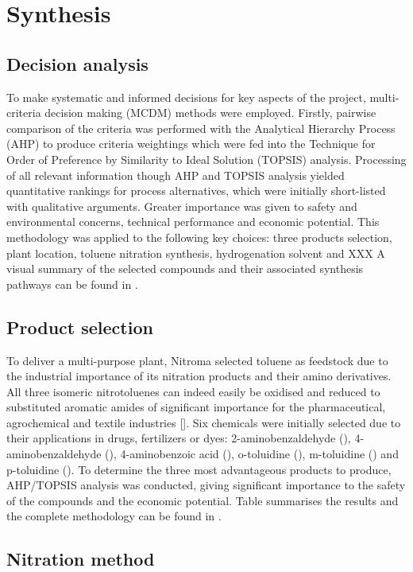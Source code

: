 \section{Synthesis}
\label{sec:synthesis}
\subsection{Decision analysis}
To make systematic and informed decisions for key aspects of the project, multi-criteria decision making (MCDM) methods were employed. Firstly, pairwise comparison of the criteria was performed with the Analytical Hierarchy Process (AHP) to produce criteria weightings which were fed into the Technique for Order of Preference by Similarity to Ideal Solution (TOPSIS) analysis. Processing of all relevant information though AHP and TOPSIS analysis yielded quantitative rankings for process alternatives, which were initially short-listed with qualitative arguments. Greater importance was given to safety and environmental concerns, technical performance and economic potential.
This methodology was applied to the following key choices: three products selection, plant location, toluene nitration synthesis, hydrogenation solvent and XXX A visual summary of the selected compounds and their associated synthesis pathways can be found in .

\subsection{Product selection}
To deliver a multi-purpose plant, Nitroma selected toluene as feedstock due to the industrial importance of its nitration products and their amino derivatives. All three isomeric nitrotoluenes can indeed easily be oxidised and reduced to substituted aromatic amides of significant importance for the pharmaceutical, agrochemical and textile industries []. Six chemicals were initially selected due to their applications in drugs, fertilizers or dyes: 2-aminobenzaldehyde (), 4-aminobenzaldehyde (), 4-aminobenzoic acid (), o-toluidine (), m-toluidine () and p-toluidine (). To determine the three most advantageous products to produce, AHP/TOPSIS analysis was conducted, giving significant importance to the safety of the compounds and the economic potential. Table summarises the results and the complete methodology can be found in .   



\subsection{Nitration method}
